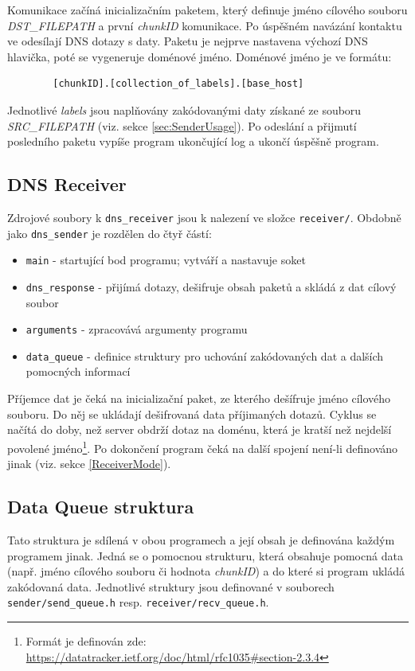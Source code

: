 \documentclass[a4paper,11pt]{article}
\begin{document}
    Komunikace začíná inicializačním paketem, který definuje jméno cílového souboru \emph{DST\_FILEPATH} a
    první \emph{chunkID} komunikace. Po úspěšném navázání kontaktu ve odesílají DNS dotazy s daty.
    Paketu je nejprve nastavena výchozí DNS hlavička, poté se vygeneruje doménové jméno. Doménové jméno je ve formátu:
    \begin{verbatim}
        [chunkID].[collection_of_labels].[base_host] \end{verbatim}
    Jednotlivé \emph{labels} jsou naplňovány zakódovanými daty získané ze souboru \emph{SRC\_FILEPATH} (viz. sekce \ref{sec:SenderUsage}).
    Po odeslání a přijmutí posledního paketu vypíše program ukončující log a ukončí úspěšně program.

    \subsection{DNS Receiver}
    Zdrojové soubory k \verb|dns_receiver| jsou k nalezení ve složce \verb|receiver/|. Obdobně jako \verb|dns_sender| je rozdělen
    do čtyř částí:
    \begin{itemize}
        \setlength\itemsep{1pt}
        \item \verb|main|           \-- startující bod programu; vytváří a nastavuje soket
        \item \verb|dns_response|   \-- přijímá dotazy, dešifruje obsah paketů a skládá z dat cílový soubor
        \item \verb|arguments|      \-- zpracovává argumenty programu
        \item \verb|data_queue|     \-- definice struktury pro uchování zakódovaných dat a dalších pomocných informací
    \end{itemize}
    Příjemce dat je čeká na inicializační paket, ze kterého dešífruje jméno cílového souboru. Do něj se ukládají dešifrovaná data
    příjimaných dotazů. Cyklus se načítá do doby, než server obdrží dotaz na doménu, která je kratší než nejdelší povolené jméno\footnote{Formát je definován zde: \url{https://datatracker.ietf.org/doc/html/rfc1035\#section-2.3.4}}.
    Po dokončení program čeká na další spojení není-li definováno jinak (viz. sekce \ref{ReceiverMode}).

    \subsection{Data Queue struktura}
    Tato struktura je sdílená v obou programech a její obsah je definována každým programem jinak.
    Jedná se o pomocnou strukturu, která obsahuje pomocná data (např. jméno cílového souboru či hodnota \emph{chunkID})
    a do které si program ukládá zakódovaná data. Jednotlivé struktury jsou definované v souborech
    \verb|sender/send_queue.h| resp. \verb|receiver/recv_queue.h|.
\end{document}
